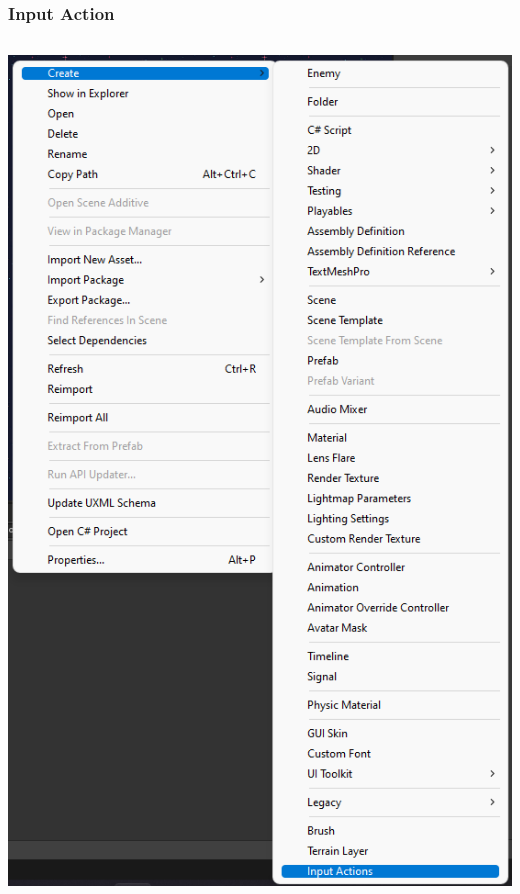 \documentclass{beamer}
\begin{document}
	\begin{frame}
		\frametitle{Input Action}

		\begin{columns}
			\includegraphics[height=0.85\textheight]{is-1}


\end{columns}
\end{frame}
\end{document}
